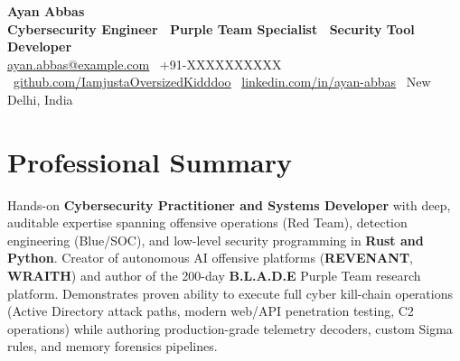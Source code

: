 \documentclass[letterpaper,10pt]{article}
\begin{document}
\begin{center}
    {\Huge \textbf{Ayan Abbas}} \\ \vspace{2pt}
    {\large \textbf{Cybersecurity Engineer \textbar\ Purple Team Specialist \textbar\ Security Tool Developer}} \\ \vspace{4pt}
    \small 
    \href{mailto:ayan.abbas@example.com}{\underline{ayan.abbas@example.com}} \textbar\ 
    +91-XXXXXXXXXX \textbar\ 
    \href{https://github.com/IamjustaOversizedKidddoo}{\underline{github.com/IamjustaOversizedKidddoo}} \textbar\ 
    \href{https://linkedin.com/in/ayan-abbas}{\underline{linkedin.com/in/ayan-abbas}} \textbar\ 
    New Delhi, India
\end{center}

\section{Professional Summary}
\small{
Hands-on \textbf{Cybersecurity Practitioner and Systems Developer} with deep, auditable expertise spanning offensive operations (Red Team), detection engineering (Blue/SOC), and low-level security programming in \textbf{Rust and Python}. Creator of autonomous AI offensive platforms (\textbf{REVENANT}, \textbf{WRAITH}) and author of the 200-day \textbf{B.L.A.D.E} Purple Team research platform. Demonstrates proven ability to execute full cyber kill-chain operations (Active Directory attack paths, modern web/API penetration testing, C2 operations) while authoring production-grade telemetry decoders, custom Sigma rules, and memory forensics pipelines.
}

\end{document}
